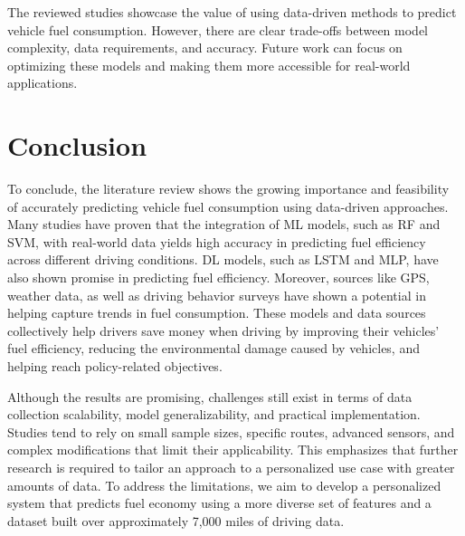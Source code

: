 \documentclass[letterpaper]{article}
\begin{document}
The reviewed studies showcase the value of using data-driven methods to predict vehicle fuel 
consumption. However, there are clear trade-offs between model complexity, data requirements, 
and accuracy. Future work can focus on optimizing these models and making them more accessible 
for real-world applications.


\section*{Conclusion}

To conclude, the literature review shows the growing importance and feasibility
of accurately predicting vehicle fuel consumption using data-driven approaches.
Many studies have proven that the integration of ML models, such as RF and SVM,
with real-world data yields high accuracy in predicting fuel efficiency across
different driving conditions. DL models, such as LSTM and MLP, have also shown
promise in predicting fuel efficiency. Moreover, sources like GPS, weather data,
as well as driving behavior surveys have shown a potential in helping capture
trends in fuel consumption. These models and data sources collectively help
drivers save money when driving by improving their vehicles' fuel efficiency,
reducing the environmental damage caused by vehicles, and helping reach
policy-related objectives. 

Although the results are promising, challenges still exist in terms of data collection 
scalability, model generalizability, and practical implementation. Studies tend to rely on 
small sample sizes, specific routes, advanced sensors, and complex modifications that limit 
their applicability. This emphasizes that further research is required to tailor an approach 
to a personalized use case with greater amounts of data. To address the limitations, we aim 
to develop a personalized system that predicts fuel economy using a more diverse set of 
features and a dataset built over approximately 7,000 miles of driving data.

 

\end{document}

